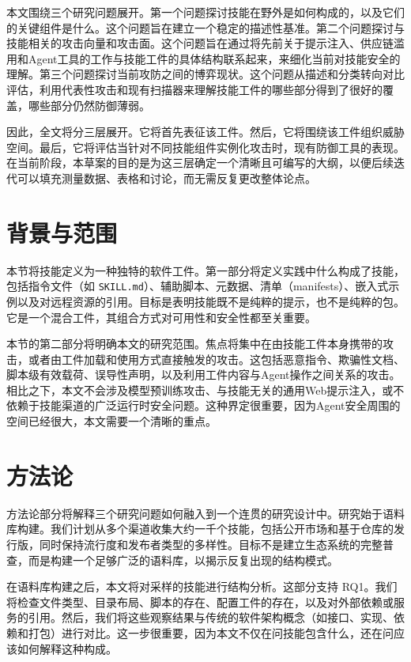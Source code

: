 \documentclass[conference]{IEEEtran}
\begin{document}
本文围绕三个研究问题展开。第一个问题探讨技能在野外是如何构成的，以及它们的关键组件是什么。这个问题旨在建立一个稳定的描述性基准。第二个问题探讨与技能相关的攻击向量和攻击面。这个问题旨在通过将先前关于提示注入、供应链滥用和Agent工具的工作与技能工件的具体结构联系起来，来细化当前对技能安全的理解。第三个问题探讨当前攻防之间的博弈现状。这个问题从描述和分类转向对比评估，利用代表性攻击和现有扫描器来理解技能工件的哪些部分得到了很好的覆盖，哪些部分仍然防御薄弱。

因此，全文将分三层展开。它将首先表征该工件。然后，它将围绕该工件组织威胁空间。最后，它将评估当针对不同技能组件实例化攻击时，现有防御工具的表现。在当前阶段，本草案的目的是为这三层确定一个清晰且可编写的大纲，以便后续迭代可以填充测量数据、表格和讨论，而无需反复更改整体论点。

\section{背景与范围}

本节将技能定义为一种独特的软件工件。第一部分将定义实践中什么构成了技能，包括指令文件（如 \texttt{SKILL.md}）、辅助脚本、元数据、清单（manifests）、嵌入式示例以及对远程资源的引用。目标是表明技能既不是纯粹的提示，也不是纯粹的包。它是一个混合工件，其组合方式对可用性和安全性都至关重要。

本节的第二部分将明确本文的研究范围。焦点将集中在由技能工件本身携带的攻击，或者由工件加载和使用方式直接触发的攻击。这包括恶意指令、欺骗性文档、脚本级有效载荷、误导性声明，以及利用工件内容与Agent操作之间关系的攻击。相比之下，本文不会涉及模型预训练攻击、与技能无关的通用Web提示注入，或不依赖于技能渠道的广泛运行时安全问题。这种界定很重要，因为Agent安全周围的空间已经很大，本文需要一个清晰的重点。

\section{方法论}

方法论部分将解释三个研究问题如何融入到一个连贯的研究设计中。研究始于语料库构建。我们计划从多个渠道收集大约一千个技能，包括公开市场和基于仓库的发行版，同时保持流行度和发布者类型的多样性。目标不是建立生态系统的完整普查，而是构建一个足够广泛的语料库，以揭示反复出现的结构模式。

在语料库构建之后，本文将对采样的技能进行结构分析。这部分支持 RQ1。我们将检查文件类型、目录布局、脚本的存在、配置工件的存在，以及对外部依赖或服务的引用。然后，我们将这些观察结果与传统的软件架构概念（如接口、实现、依赖和打包）进行对比。这一步很重要，因为本文不仅在问技能包含什么，还在问应该如何解释这种构成。
\end{document}
